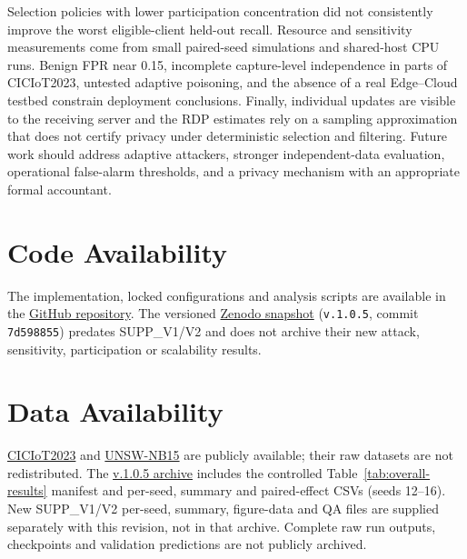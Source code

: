 \documentclass[5p,times,numafflabel]{elsarticle}
\begin{document}
Selection policies with lower participation concentration did
not consistently improve the worst eligible-client held-out
recall. Resource and sensitivity measurements come from small
paired-seed simulations and shared-host CPU runs. Benign FPR
near 0.15, incomplete capture-level independence in parts of
CICIoT2023, untested adaptive poisoning, and the absence of a
real Edge--Cloud testbed constrain deployment conclusions.
Finally, individual updates are visible to the receiving server
and the RDP estimates rely on a sampling approximation that does
not certify privacy under deterministic selection and filtering.
Future work should address adaptive attackers, stronger
independent-data evaluation, operational false-alarm thresholds,
and a privacy mechanism with an appropriate formal accountant.



	\section*{Code Availability}

The implementation, locked configurations and analysis scripts are
available in the \href{https://github.com/RezaAzarnia/routing-aware-fl-edgecloud-iot-ids}{GitHub repository}.
The versioned \href{https://doi.org/10.5281/zenodo.24032087}{Zenodo snapshot}
(\texttt{v.1.0.5}, commit \texttt{7d598855}) predates SUPP\_V1/V2 and
does not archive their new attack, sensitivity, participation or
scalability results.

\section*{Data Availability}

\href{https://cicresearch.ca/IOTDataset/CIC_IOT_Dataset2023/}{CICIoT2023}
and \href{https://www.kaggle.com/datasets/mrwellsdavid/unsw-nb15}{UNSW-NB15}
are publicly available; their raw datasets are not redistributed.
The \href{https://doi.org/10.5281/zenodo.24032087}{v.1.0.5 archive}
includes the controlled Table~\ref{tab:overall-results} manifest and
per-seed, summary and paired-effect CSVs (seeds 12--16).
New SUPP\_V1/V2 per-seed, summary, figure-data and QA files are supplied
separately with this revision, not in that archive. Complete raw
run outputs, checkpoints and validation predictions are not publicly archived.

\FloatBarrier
	\setlength{\bibsep}{0pt}
	
	
	
\end{document}
